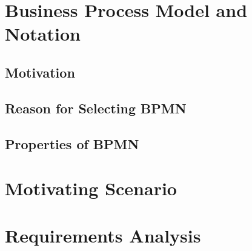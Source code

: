 \chapter{Business Process Model and Notation} \label{chap:bpmn}
\section{Motivation}
\section{Reason for Selecting BPMN}
\section{Properties of BPMN}

\chapter{Motivating Scenario} \label{chap:motscene}

\chapter{Requirements Analysis} \label{chap:requirements}